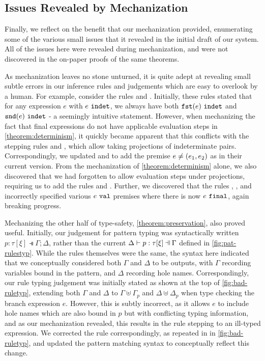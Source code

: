 \subsection{Issues Revealed by Mechanization}\label{sec:errors}
Finally, we reflect on the benefit that our mechanization provided, enumerating some of the various small issues that it revealed in the initial draft of our system. All of the issues here were revealed during mechanization, and were not discovered in the on-paper proofs of the same theorems.

As mechanization leaves no stone unturned, it is quite adept at revealing small subtle errors in our inference rules and judgements which are easy to overlook by a human. For example, consider the rules \IFst and \ISnd. Initially, these rules stated that for any expression $e$ with $e ~\mathtt{indet}$, we always have both $\mathtt{fst}(e) ~\mathtt{indet}$ and $\mathtt{snd}(e) ~\mathtt{indet}$ - a seemingly intuitive statement. However, when mechanizing the fact that final expressions do not have applicable evaluation steps in \autoref{theorem:determinism}, it quickly became apparent that this conflicts with the stepping rules \ITFstPair and \ITSndPair, which allow taking projections of indeterminate pairs. Correspondingly, we updated \IFst and \ISnd to add the premise $e \neq (e_1 , e_2)$ as in their current version. From the mechanization of \autoref{theorem:determinism} alone, we also discovered that we had forgotten to allow evaluation steps under projections, requiring us to add the rules \ITFst and \ITSnd. Further, we discovered that the rules \ITApArg, \ITAp, and \ITPairR incorrectly specified various $e ~\mathtt{val}$ premises where there is now $e ~\mathtt{final}$, again breaking progress. 



Mechanizing the other half of type-safety, \autoref{theorem:preservation}, also proved useful. Initially, our judgement for pattern typing was syntactically written $p : \tau [\xi] \dashV \Gamma; \Delta$, rather than the current $\chpattyp{p}{\tau}{\xi}{\Gamma}{\Delta}$ defined in \autoref{fig:pat-rulestyp}. While the rules themselves were the same, the syntax here indicated that we conceptually considered both $\Gamma$ and $\Delta$ to be outputs, with $\Gamma$ recording variables bound in the pattern, and $\Delta$ recording hole names. Correspondingly, our rule typing judgement was initially stated as \BadTRule shown at the top of \autoref{fig:bad-ruletyp}, extending both $\Gamma$ and $\Delta$ to $\Gamma \uplus \Gamma_p$ and $\Delta \uplus \Delta_p$ when type checking the branch expression $e$. However, this is subtly incorrect, as it allows $e$ to include hole names which are also bound in $p$ but with conflicting typing information, and as our mechanization revealed, this results in the \ITSuccMatch rule stepping to an ill-typed expression. We corrected the rule correspondingly, as repeated in \GoodTRule in \autoref{fig:bad-ruletyp}, and updated the pattern matching syntax to conceptually reflect this change.

